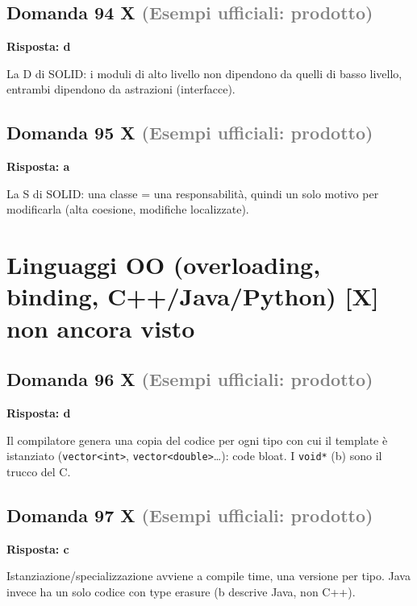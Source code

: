 \documentclass[a4paper,11pt]{article}
\begin{document}
\subsection*{Domanda 94 X \hfill {\small \textcolor{gray}{(Esempi ufficiali: prodotto)}}}
\textbf{Risposta: d}\par
La D di SOLID: i moduli di alto livello non dipendono da quelli di basso livello, entrambi dipendono da astrazioni (interfacce).



\subsection*{Domanda 95 X \hfill {\small \textcolor{gray}{(Esempi ufficiali: prodotto)}}}
\textbf{Risposta: a}\par
La S di SOLID: una classe = una responsabilità, quindi un solo motivo per modificarla (alta coesione, modifiche localizzate).



\section{Linguaggi OO (overloading, binding, C++/Java/Python) [X] non ancora visto}

\subsection*{Domanda 96 X \hfill {\small \textcolor{gray}{(Esempi ufficiali: prodotto)}}}
\textbf{Risposta: d}\par
Il compilatore genera una copia del codice per ogni tipo con cui il template è istanziato (\texttt{vector\textless{}int\textgreater{}}, \texttt{vector\textless{}double\textgreater{}}…): code bloat. I \texttt{void*} (b) sono il trucco del C.



\subsection*{Domanda 97 X \hfill {\small \textcolor{gray}{(Esempi ufficiali: prodotto)}}}
\textbf{Risposta: c}\par
Istanziazione/specializzazione avviene a compile time, una versione per tipo. Java invece ha un solo codice con type erasure (b descrive Java, non C++).
\end{document}
